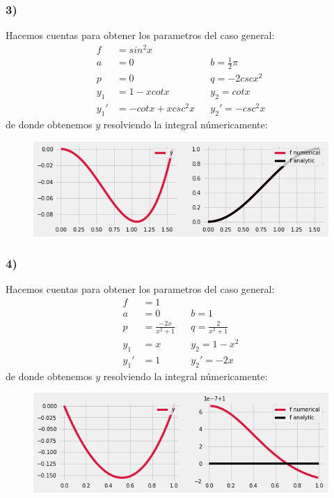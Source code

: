 \documentclass{article}
\begin{document}
\begin{tcolorbox}
    \subsubsection*{3)}
    Hacemos cuentas para obtener los parametros del caso general:
    \begin{align*}
        f&= sin^2x \\
        a&=0 &&b=\frac{1}{2}\pi \\
        p&=0 &&q= -2cscx^2 \\
        y_1 &= 1-xcotx  &&y_2= cotx \\
        y_1' &= -cotx + xcsc^2x  &&y_2'= -csc^2x 
    \end{align*}
    de donde obtenemos $y$ resolviendo la integral númericamente:
    \begin{figure}[H]
        \centering
        \includegraphics[scale=0.7]{images/p3_3.png}
    \end{figure}

    \subsubsection*{4)}
    Hacemos cuentas para obtener los parametros del caso general:
    \begin{align*}
        f&= 1 \\
        a &=0 &&b=1 \\
        p &=\frac{-2x}{x^2+1} &&q= \frac{2}{x^2+1} \\
        y_1 &=x  &&y_2= 1-x^2 \\
        y_1' &=1 &&y_2'= -2x  
    \end{align*}
    de donde obtenemos $y$ resolviendo la integral númericamente:
    \begin{figure}[H]
        \centering
        \includegraphics[scale=0.7]{images/p3_4.png}
    \end{figure}

\end{tcolorbox}
\end{document}
